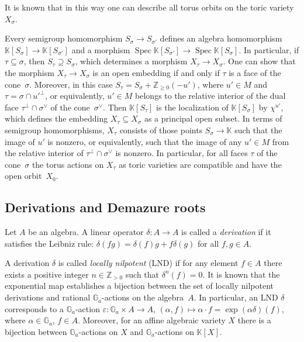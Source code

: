 \documentclass[a4paper, 11pt]{amsart}
\theoremstyle{plain}
\theoremstyle{remark}
\theoremstyle{definition}
\newcommand{\ZZ}{\mathbb{Z}}
\newcommand{\KK}{\mathbb{K}}
\newcommand{\G}{\mathbb{G}}
\DeclareMathOperator{\Spec}{Spec}
\begin{document}
It is known that in this way one can describe all torus orbits on the toric variety $X_\sigma$.

Every semigroup homomorphism $S_\sigma \to S_{\sigma'}$ defines an algebra homomorphism $\KK[S_\sigma] \to \KK[S_{\sigma'}]$ and a morphism $\Spec \KK[S_{\sigma'}] \to \Spec \KK[S_\sigma]$. In particular, if $\tau \subseteq \sigma$, then $S_\tau \supseteq S_\sigma$, which determines a morphism $X_\tau \to X_\sigma$. One can show that the morphism $X_\tau \to X_\sigma$ is an open embedding if and only if $\tau$ is a face of the cone~$\sigma$. Moreover, in this case $S_\tau = S_\sigma + \ZZ_{\ge0}(-u')$, where $u' \in M$ and $\tau = \sigma \cap u'^\perp$, or equivalently, $u' \in M$ belongs to the relative interior of the dual face $\tau^\perp \cap \sigma^\vee$ of the cone~$\sigma^\vee$. Then $\KK[S_\tau]$ is the localization of $\KK[S_\sigma]$ by $\chi^{u'}$, which defines the embedding $X_\tau \subseteq X_\sigma$ as a principal open subset. In terms of semigroup homomorphisms, $X_\tau$ consists of those points $S_\sigma \to \KK$ such that the image of $u'$ is nonzero, or equivalently, such that the image of any $u' \in M$ from the relative interior of $\tau^\perp \cap \sigma^\vee$ is nonzero. In particular, for all faces $\tau$ of the cone~$\sigma$ the torus actions on $X_\tau$ as toric varieties are compatible and have the open orbit~$X_0$.

\subsection{Derivations and Demazure roots}\label{root}

Let $A$ be an algebra. A linear operator $\delta\colon A \rightarrow A$ is called a \textit{derivation} if it satisfies the Leibniz rule:
$\delta(fg) = \delta(f) g + f \delta(g)$ for all $f,g \in A$.

A derivation $\delta$ is called \textit{locally nilpotent} (LND) if for any element $f \in A$ there exists a positive integer $n \in \ZZ_{>0}$ such that $\delta^n(f) = 0$. It is known that the exponential map establishes a bijection between the set of locally nilpotent derivations and rational $\G_a$-actions on the algebra~$A$. In particular, an LND $\delta$ corresponds to a $\G_a$-action $\varepsilon\colon \G_a \times A \rightarrow A$, $(\alpha, f) \mapsto \alpha\cdot f = \exp(\alpha \delta)(f)$, where $\alpha \in \G_a$, $f \in A$. Moreover, for an affine algebraic variety $X$ there is a bijection between $\G_a$-actions on $X$ and $\G_a$-actions on $\KK[X]$.
\end{document}
